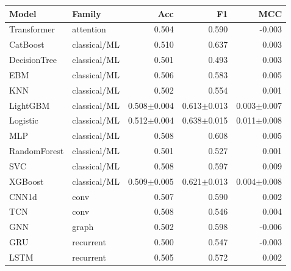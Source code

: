 \begin{tabular}{@{}llrrr@{}}
\toprule
Model & Family & Acc & F1 & MCC \\
\midrule
Transformer & attention & 0.504 & 0.590 & -0.003 \\
CatBoost & classical/ML & 0.510 & 0.637 & 0.003 \\
DecisionTree & classical/ML & 0.501 & 0.493 & 0.003 \\
EBM & classical/ML & 0.506 & 0.583 & 0.005 \\
KNN & classical/ML & 0.502 & 0.554 & 0.001 \\
LightGBM & classical/ML & 0.508$\pm$0.004 & 0.613$\pm$0.013 & 0.003$\pm$0.007 \\
Logistic & classical/ML & 0.512$\pm$0.004 & 0.638$\pm$0.015 & 0.011$\pm$0.008 \\
MLP & classical/ML & 0.508 & 0.608 & 0.005 \\
RandomForest & classical/ML & 0.501 & 0.527 & 0.001 \\
SVC & classical/ML & 0.508 & 0.597 & 0.009 \\
XGBoost & classical/ML & 0.509$\pm$0.005 & 0.621$\pm$0.013 & 0.004$\pm$0.008 \\
CNN1d & conv & 0.507 & 0.590 & 0.002 \\
TCN & conv & 0.508 & 0.546 & 0.004 \\
GNN & graph & 0.502 & 0.598 & -0.006 \\
GRU & recurrent & 0.500 & 0.547 & -0.003 \\
LSTM & recurrent & 0.505 & 0.572 & 0.002 \\
\bottomrule
\end{tabular}
